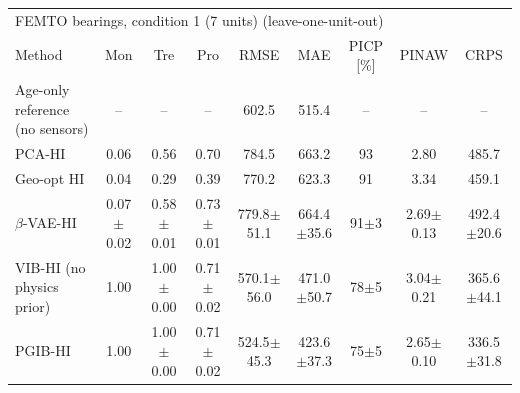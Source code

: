 \begin{tabular}{l c c c c c c c c}
\hline
\multicolumn{9}{l}{FEMTO bearings, condition 1 (7 units) (leave-one-unit-out)}\\
 Method & Mon & Tre & Pro & RMSE & MAE & PICP [\%] & PINAW & CRPS \\
\hline
Age-only reference (no sensors) & -- & -- & -- & 602.5 & 515.4 & -- & -- & -- \\
PCA-HI & 0.06 & 0.56 & 0.70 & 784.5 & 663.2 & 93 & 2.80 & 485.7 \\
Geo-opt HI & 0.04 & 0.29 & 0.39 & 770.2 & 623.3 & 91 & 3.34 & 459.1 \\
$\beta$-VAE-HI & 0.07$\pm$0.02 & 0.58$\pm$0.01 & 0.73$\pm$0.01 & 779.8$\pm$51.1 & 664.4$\pm$35.6 & 91$\pm$3 & 2.69$\pm$0.13 & 492.4$\pm$20.6 \\
VIB-HI (no physics prior) & 1.00 & 1.00$\pm$0.00 & 0.71$\pm$0.02 & 570.1$\pm$56.0 & 471.0$\pm$50.7 & 78$\pm$5 & 3.04$\pm$0.21 & 365.6$\pm$44.1 \\
PGIB-HI & 1.00 & 1.00$\pm$0.00 & 0.71$\pm$0.02 & 524.5$\pm$45.3 & 423.6$\pm$37.3 & 75$\pm$5 & 2.65$\pm$0.10 & 336.5$\pm$31.8 \\
\hline
\end{tabular}
